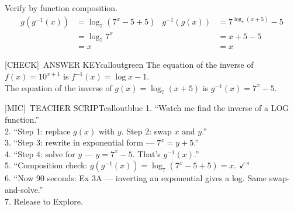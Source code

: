\documentclass[11pt]{article}
\newcommand{\IconCheck}{[CHECK]}
\newcommand{\IconMic}{[MIC]}
\newcommand{\teacheranswerbox}[2]{%
  \begin{callout}{#1}{calloutgreen}
  #2
  \end{callout}
}
\begin{document}
{Verify by function composition.
\begin{align*}
g(g^{-1}(x)) &= \log_7(7^x - 5 + 5) & g^{-1}(g(x)) &= 7^{\log_7(x + 5)} - 5 \\
&= \log_7 7^x & &= x + 5 - 5 \\
&= x & &= x
\end{align*}

\begin{center}
\end{center}
}{}

\teacheranswerbox{\IconCheck\ ANSWER KEY}{%
The equation of the inverse of \(f(x) = 10^{x+1}\) is \(f^{-1}(x) = \log x - 1\).\\
The equation of the inverse of \(g(x) = \log_7(x + 5)\) is \(g^{-1}(x) = 7^x - 5\).
}

\begin{callout}{\IconMic\ TEACHER SCRIPT}{calloutblue}
1. ``Watch me find the inverse of a LOG function.''\\
2. ``Step 1: replace \(g(x)\) with \(y\). Step 2: swap \(x\) and \(y\).''\\
3. ``Step 3: rewrite in exponential form --- \(7^x = y+5\).''\\
4. ``Step 4: solve for \(y\) --- \(y = 7^x - 5\). That's \(g^{-1}(x)\).''\\
5. ``Composition check: \(g(g^{-1}(x)) = \log_7(7^x-5+5) = x.\) \(\checkmark\)''\\
6. ``Now 90 seconds: Ex 3A --- inverting an exponential gives a log. Same swap-and-solve.''\\
7. Release to Explore.
\end{callout}
\end{document}
